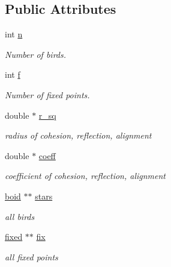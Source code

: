 \subsection*{Public Attributes}
\begin{DoxyCompactItemize}
\item 
\mbox{\label{classflock_a59c42af43982fa5a4e709d6966de95ed}} 
int \mbox{\hyperlink{classflock_a59c42af43982fa5a4e709d6966de95ed}{n}}
\begin{DoxyCompactList}\small\item\em Number of birds. \end{DoxyCompactList}\item 
\mbox{\label{classflock_a0fe6d75d90e0df49df6684358cee3c41}} 
int \mbox{\hyperlink{classflock_a0fe6d75d90e0df49df6684358cee3c41}{f}}
\begin{DoxyCompactList}\small\item\em Number of fixed points. \end{DoxyCompactList}\item 
\mbox{\label{classflock_a8b12a55829e2b0d6e5e64b5555aa6716}} 
double $\ast$ \mbox{\hyperlink{classflock_a8b12a55829e2b0d6e5e64b5555aa6716}{r\+\_\+sq}}
\begin{DoxyCompactList}\small\item\em radius of cohesion, reflection, alignment \end{DoxyCompactList}\item 
\mbox{\label{classflock_af708fbbf7cfd3a1595906ba16a06ef49}} 
double $\ast$ \mbox{\hyperlink{classflock_af708fbbf7cfd3a1595906ba16a06ef49}{coeff}}
\begin{DoxyCompactList}\small\item\em coefficient of cohesion, reflection, alignment \end{DoxyCompactList}\item 
\mbox{\label{classflock_a207ef179017b265ad7004f5ef7449e2a}} 
\mbox{\hyperlink{classboid}{boid}} $\ast$$\ast$ \mbox{\hyperlink{classflock_a207ef179017b265ad7004f5ef7449e2a}{stars}}
\begin{DoxyCompactList}\small\item\em all birds \end{DoxyCompactList}\item 
\mbox{\label{classflock_a98f966a1e721225bb0a1864e3156f724}} 
\mbox{\hyperlink{classfixed}{fixed}} $\ast$$\ast$ \mbox{\hyperlink{classflock_a98f966a1e721225bb0a1864e3156f724}{fix}}
\begin{DoxyCompactList}\small\item\em all fixed points \end{DoxyCompactList}\end{DoxyCompactItemize}


